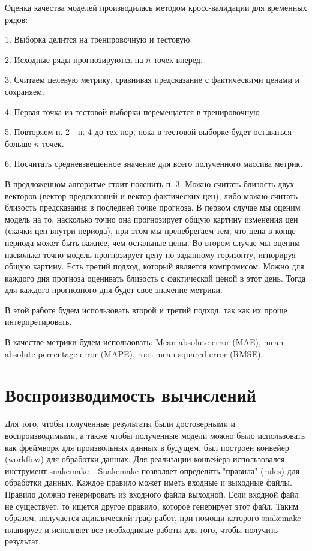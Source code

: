 \documentclass[a4paper,article,14pt]{extarticle}
\begin{document}
Оценка качества моделей производилась методом кросс-валидации для временных рядов:

1.
Выборка делится на тренировочную и тестовую.

2.
Исходные ряды прогнозируются на $n$ точек вперед.

3.
Считаем целевую метрику, сравнивая предсказание с фактическими ценами и сохраняем.

4.
Первая точка из тестовой выборки перемещается в тренировочную

5.
Повторяем п. 2 - п. 4 до тех пор, пока в тестовой выборке будет оставаться больше $n$ точек.

6.
Посчитать средневзвешенное значение для всего полученного массива метрик.

В предложенном алгоритме стоит пояснить п. 3.
Можно считать близость двух векторов (вектор предсказаний и вектор фактических цен), либо можно считать близость предсказания в последней точке прогноза.
В первом случае мы оценим модель на то, насколько точно она прогнозирует общую картину изменения цен (скачки цен внутри периода), при этом мы пренебрегаем тем, что цена в конце периода может быть важнее, чем остальные цены.
Во втором случае мы оценим насколько точно модель прогнозирует цену по заданному горизонту, игнорируя общую картину.
Есть третий подход, который является компромисом.
Можно для каждого дня прогноза оценивать близость с фактической ценой в этот день.
Тогда для каждого прогнозного дня будет свое значение метрики.

В этой работе будем использовать второй и третий подход, так как их проще интерпретировать.

В качестве метрики будем использовать: Mean absolute error (MAE), mean absolute percentage error (MAPE), root mean squared error (RMSE).

\section{Воспроизводимость вычислений}

Для того, чтобы полученные результаты были достоверными и воспроизводимыми, а также чтобы полученные модели можно было использовать как фреймворк для произвольных данных в будущем, был построен конвейер (workflow) для обработки данных.
Для реализации конвейера использовался инструмент snakemake~\cite{snakemake}.
Snakemake позволяет определять "правила" (rules) для обработки данных.
Каждое правило может иметь входные и выходные файлы.
Правило должно генерировать из входного файла выходной.
Если входной файл не существует, то ищется другое правило, которое генерирует этот файл.
Таким образом, получается ациклический граф работ, при помощи которого snakemake планирует и исполняет все необходимые работы для того, чтобы получить результат.
\end{document}
